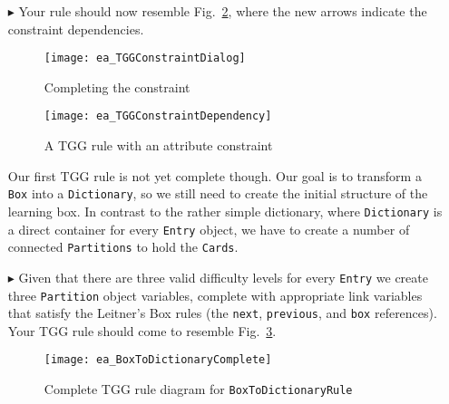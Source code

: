 \begin{enumerate}
\item[$\blacktriangleright$] Your rule should now resemble Fig.~\ref{ea:tgg_rule_with_constraint}, where the new arrows indicate the constraint dependencies.

\newpage

\begin{figure}[htbp]
\begin{center}
  \texttt{[image: ea\_TGGConstraintDialog]}
  \caption{Completing the constraint}
  \label{ea:first_tgg_constraint}
\end{center}
\end{figure}

\vspace{1cm}

\begin{figure}[h!]
\begin{center}
  \texttt{[image: ea\_TGGConstraintDependency]}
  \caption{A TGG rule with an attribute constraint}
  \label{ea:tgg_rule_with_constraint}
  \end{center}
\end{figure}

\newpage

Our first TGG rule is not yet complete though. Our goal is to transform a \texttt{Box} into a \texttt{Dictionary}, so we still need to create the initial
structure of the learning box. In contrast to the rather simple dictionary, where \texttt{Dictionary} is a direct container for every \texttt{Entry} object, we
have to create a number of connected \texttt{Partitions} to hold the \texttt{Cards}.

\vspace{0.5cm}

\item[$\blacktriangleright$] Given that there are three valid difficulty levels for every \texttt{Entry} we create three \texttt{Partition} object variables,
complete with appropriate link variables that satisfy the Leitner's Box rules (the \texttt{next}, \texttt{previous}, and \texttt{box} references). Your TGG rule
should come to resemble Fig.~\ref{ea:boxtodictionaryrule_complete}.

\vspace{0.5cm}

\begin{figure}[htbp]
\begin{center}
  \texttt{[image: ea\_BoxToDictionaryComplete]}
  \caption{Complete TGG rule diagram for \texttt{BoxToDictionaryRule}}
  \label{ea:boxtodictionaryrule_complete}
\end{center}
\end{figure}

\end{enumerate}

